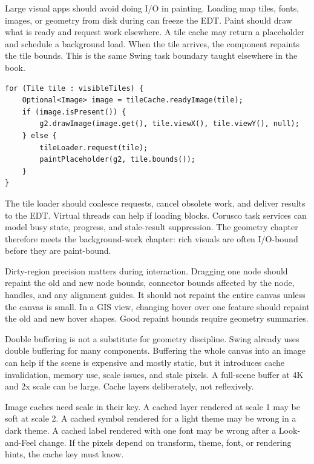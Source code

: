 Large visual apps should avoid doing I/O in painting. Loading map tiles, fonts, images, or geometry from disk during  can freeze the EDT. Paint should draw what is ready and request work elsewhere. A tile cache may return a placeholder and schedule a background load. When the tile arrives, the component repaints the tile bounds. This is the same Swing task boundary taught elsewhere in the book.

\begin{lstlisting}[caption={Paint only ready tiles and schedule missing work elsewhere.}]
for (Tile tile : visibleTiles) {
    Optional<Image> image = tileCache.readyImage(tile);
    if (image.isPresent()) {
        g2.drawImage(image.get(), tile.viewX(), tile.viewY(), null);
    } else {
        tileLoader.request(tile);
        paintPlaceholder(g2, tile.bounds());
    }
}
\end{lstlisting}

The tile loader should coalesce requests, cancel obsolete work, and deliver results to the EDT. Virtual threads can help if loading blocks. Corusco task services can model busy state, progress, and stale-result suppression. The geometry chapter therefore meets the background-work chapter: rich visuals are often I/O-bound before they are paint-bound.

Dirty-region precision matters during interaction. Dragging one node should repaint the old and new node bounds, connector bounds affected by the node, handles, and any alignment guides. It should not repaint the entire canvas unless the canvas is small. In a GIS view, changing hover over one feature should repaint the old and new hover shapes. Good repaint bounds require geometry summaries.

Double buffering is not a substitute for geometry discipline. Swing already uses double buffering for many components. Buffering the whole canvas into an image can help if the scene is expensive and mostly static, but it introduces cache invalidation, memory use, scale issues, and stale pixels. A full-scene buffer at 4K and 2x scale can be large. Cache layers deliberately, not reflexively.

Image caches need scale in their key. A cached layer rendered at scale 1 may be soft at scale 2. A cached symbol rendered for a light theme may be wrong in a dark theme. A cached label rendered with one font may be wrong after a Look-and-Feel change. If the pixels depend on transform, theme, font, or rendering hints, the cache key must know.

